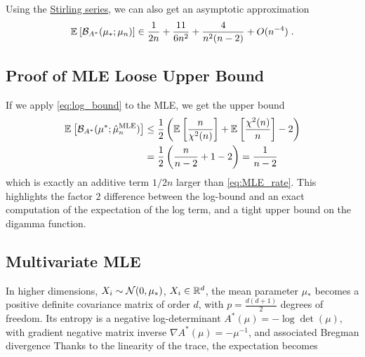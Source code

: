 \documentclass{article}
\newcommand*{\expect}[2][]{\ensuremath{\mathbb{E}_{#1} \left[ #2 \right] }} %
\newcommand{\logpart}{A}
\newcommand{\conj}{\logpart^*}
\newcommand{\bregmanconj}{\cB_{\logpart^*}}
\newcommand{\MAPm}{\hat \mu_n}
\begin{document}
Using the \href{https://en.wikipedia.org/wiki/Digamma_function#Recurrence_formula_and_characterization}{Stirling series}, we can also get an asymptotic approximation
	\begin{align}
		\expect{\bregmanconj( \mu_*; \mu_n) }
		\in \inv{2n} + \frac{11}{6 n^2} + \frac{4}{n^2(n-2)} + O(n^{-4}) \; .
	\end{align}
	
	
\subsection{Proof of MLE Loose Upper Bound}
If we apply \eqref{eq:log_bound} to the MLE, we get the upper bound
\begin{align}
	\expect{\bregmanconj(\mu^*; \MAPm^\text{MLE})}
	&\leq  \half \left( \expect{\frac{n}{\chi^2(n)}} + \expect{\frac{\chi^2(n)}{n}} - 2 \right ) \\
	&= \half \left( \frac{n}{n-2} + 1 - 2 \right)  
	= \frac{1}{n-2}
\end{align}
which is exactly  an additive term $1/2n$ larger than \eqref{eq:MLE_rate}. This highlights the factor $2$ difference between the log-bound and an exact computation of the expectation of the log term, and a tight upper bound on the digamma function.

\subsection{Multivariate MLE}
In higher dimensions, $X_i \sim {\mathcal N}(0, \mu_*)$, $X_i\in\mathbb{R}^d$, the mean parameter $\mu_*$ becomes a positive definite covariance matrix of order $d$, with $p = \frac{d(d+1)}{2} $ degrees of freedom.
Its entropy is a negative log-determinant $\conj(\mu) = -\log\det(\mu)$, with gradient negative matrix inverse $\nabla\conj (\mu) = - \mu^{-1}$, and associated Bregman divergence
\alignn{
	\bregmanconj(\mu_*; \hat \mu_n) 
	= \half \paren{\Tr(\mu_* \hat \mu_n^{-1} ) - d  - \log\det(\mu_* \hat \mu_n^{-1}) } \; .
}
Thanks to the linearity of the trace, the expectation becomes
\alignn{
	\expect{\bregmanconj(\mu_*; \hat \mu_n) }
	= \half \paren{\Tr(\expect{\mu_* \hat \mu_n^{-1}} ) - d   
	+\expect{\log\det( \hat \mu_n \mu_*^{ -1}))} } \; .
}
\end{document}
